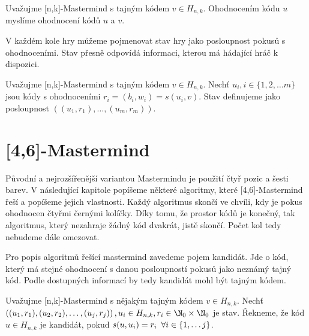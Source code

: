 
\begin{definice} \label{ohodnoceni2}
  Uvažujme [n,k]-Mastermind s tajným kódem $v \in H_{n,k}$.
  Ohodnocením kódu $u$ myslíme ohodnocení kódů $u$ a $v$.
\end{definice}


V každém kole hry můžeme pojmenovat stav hry jako posloupnost pokusů s ohodnoceními. Stav přesně odpovídá informaci, kterou má hádající hráč k dispozici.
\begin{definice}[Stav]\label{stav}
   Uvažujme [n,k]-Mastermind s tajným kódem $v \in H_{n,k}$. 
   Nechť $u_i, i\in \{1,2,\dots m\}$ jsou kódy s ohodnoceními $r_i = (b_i,w_i) = s(u_i,v)$. Stav definujeme jako posloupnost $((u_1, r_1), \dots, (u_m, r_m))$.
\end{definice}











\chapter{[4,6]-Mastermind}
Původní a nejrozšířenější variantou Mastermindu je použití čtyř pozic a šesti barev. 
V následující kapitole popíšeme některé algoritmy, které [4,6]-Mastermind řeší a popíšeme jejich vlastnosti. Každý algoritmus skončí ve chvíli, kdy je pokus ohodnocen čtyřmi černými kolíčky. Díky tomu, že prostor kódů je konečný, tak algoritmus, který nezahraje žádný kód dvakrát, jistě skončí. Počet kol tedy nebudeme dále omezovat. 


Pro popis algoritmů řešící mastermind zavedeme pojem kandidát. Jde o kód, který má stejné ohodnocení s danou posloupností pokusů jako neznámý tajný kód. Podle dostupných informací by tedy kandidát mohl být tajným kódem.


\begin{definice}[kandidát]\label{kandidat}
  Uvažujme [n,k]-Mastermind s nějakým tajným kódem $v\in H_{n,k}$.
  Nechť $\left((u_1, r_1), (u_2,r_2), \dots, (u_j,r_j)\right), u_i \in H_{n,k}, r_i \in \N _0 \times \N _0$ je stav. Řekneme, že kód $u \in H_{n,k}$ je kandidát, pokud $s(u,u_i) = r_i \hspace{5px} \forall i \in \{1, \dots j\}$. 
\end{definice}



